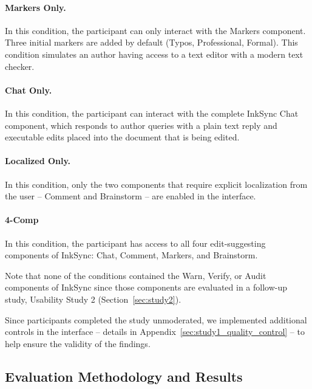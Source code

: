 \documentclass[manuscript]{acmart}
\begin{document}
\paragraph{Markers Only.} In this condition, the participant can only interact with the Markers component. Three initial markers are added by default (Typos, Professional, Formal). This condition simulates an author having access to a text editor with a modern text checker.

\paragraph{Chat Only.} In this condition, the participant can interact with the complete InkSync Chat component, which responds to author queries with a plain text reply and executable edits placed into the document that is being edited.

\paragraph{Localized Only.} In this condition, only the two components that require explicit localization from the user -- Comment and Brainstorm -- are enabled in the interface.

\paragraph{4-Comp} In this condition, the participant has access to all four edit-suggesting components of InkSync: Chat, Comment, Markers, and Brainstorm.

Note that none of the conditions contained the Warn, Verify, or Audit components of InkSync since those components are evaluated in a follow-up study, Usability Study 2 (Section~\ref{sec:study2}).

Since participants completed the study unmoderated, we implemented additional controls in the interface -- details in Appendix~\ref{sec:study1_quality_control} -- to help ensure the validity of the findings.

\subsection{Evaluation Methodology and Results} \label{sec:study1_evaluation}


\end{document}
